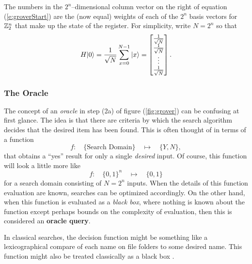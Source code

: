 The numbers in the $2^n$--dimensional column vector on the right 
of equation (\ref{e:groverStart}) are the (now equal) weights of each 
of the $2^n$ basis vectors for ${\mathbb{Z}}_2^n$ that make up the state of the
register.
For simplicity, write $N=2^n$ so that
\begin{equation}
H{|{0}\rangle} = \frac{1}{\sqrt{N}}\sum_{x=0}^{N-1}{|{x}\rangle} 
= \left[ \begin{matrix}
            \frac{1}{\sqrt{N}}\\
            \frac{1}{\sqrt{N}}\\
            \vdots\\
            \frac{1}{\sqrt{N}}
         \end{matrix} 
  \right].
\end{equation}

\subsubsection{The Oracle}

The concept of an \emph{oracle} in step (2a) of figure (\ref{fig:grover}) 
can be confusing at first glance.  The idea is that there are criteria
by which the search algorithm decides that the desired item has been found.
This is often thought of in terms of a function
\begin{equation}
f\colon\quad\lbrace\mbox{Search Domain}\rbrace\quad\mapsto\quad\lbrace Y,N\rbrace,
\end{equation}
that obtains a ``yes'' result for only a single {\sl desired} input.
Of course, this function will look a little more like 
\begin{equation}
f\colon\quad\lbrace 0,1\rbrace^n\quad\mapsto\quad\lbrace 0,1\rbrace
\end{equation}
for a search domain consisting of $N=2^n$ inputs.
When the details of this function evaluation are known, searches can
be optimized accordingly.  On the other hand, when this function is 
evaluated as a \emph{black box}, where nothing is known about the function 
except perhaps bounds on the complexity of evaluation, then this is 
considered an \textbf{oracle query}.

In classical searches, the decision function might be something like
a lexicographical 
compare of each name on file folders to some desired name.  
This function might also be treated classically as a black 
box .

